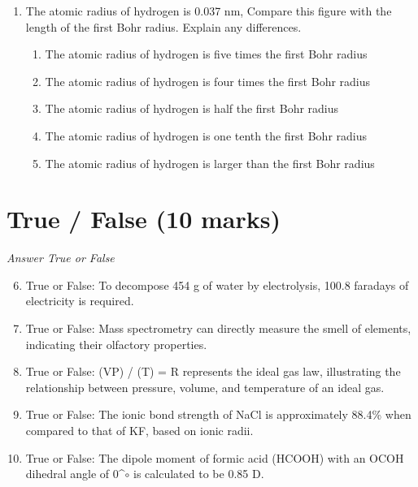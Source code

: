 \documentclass[12pt]{article}
\begin{document}
\begin{enumerate}[label=\arabic*.]
\begin{enumerate}[label=(\alph*)]
    \item 20.5 MeV
    \item 21.2 MeV
\end{enumerate}
\item The atomic radius of hydrogen is 0.037 nm, Compare this figure with the length of the first Bohr radius. Explain any differences.
\begin{enumerate}[label=(\alph*)]
    \item The atomic radius of hydrogen is five times the first Bohr radius
    \item The atomic radius of hydrogen is four times the first Bohr radius
    \item The atomic radius of hydrogen is half the first Bohr radius
    \item The atomic radius of hydrogen is one tenth the first Bohr radius
    \item The atomic radius of hydrogen is larger than the first Bohr radius
\end{enumerate}
\end{enumerate}

\section*{True / False (10 marks)}
\textit{Answer True or False}
\begin{enumerate}[label=\arabic*.]
\setcounter{enumi}{5}
\item True or False: To decompose 454 g of water by electrolysis, 100.8 faradays of electricity is required.
\item True or False: Mass spectrometry can directly measure the smell of elements, indicating their olfactory properties.
\item True or False: (VP) / (T) = R represents the ideal gas law, illustrating the relationship between pressure, volume, and temperature of an ideal gas.
\item True or False: The ionic bond strength of NaCl is approximately 88.4\% when compared to that of KF, based on ionic radii.
\item True or False: The dipole moment of formic acid (HCOOH) with an OCOH dihedral angle of 0^\ensuremath{\circ} is calculated to be 0.85 D.
\end{enumerate}
\end{document}
